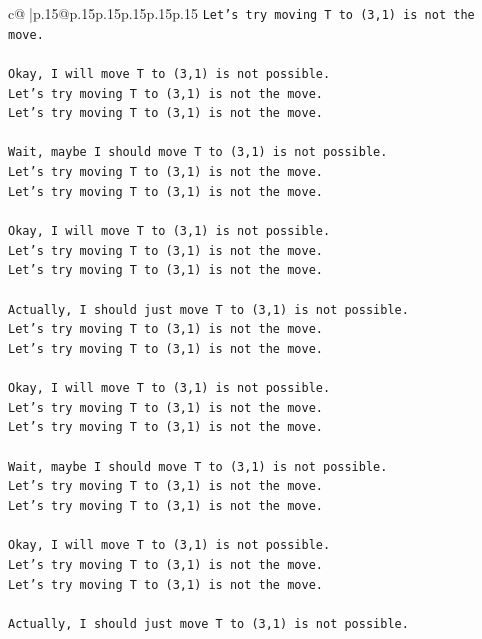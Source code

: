 \documentclass{article}
\begin{document}
{\begin{supertabular}{c@{$\;$}|p{.15\linewidth}@{}p{.15\linewidth}p{.15\linewidth}p{.15\linewidth}p{.15\linewidth}p{.15\linewidth}}
{{{\texttt{Let's try moving T to (3,1) is not the move.} \\
\\ 
\texttt{Okay, I will move T to (3,1) is not possible.} \\
\texttt{Let's try moving T to (3,1) is not the move.} \\
\texttt{Let's try moving T to (3,1) is not the move.} \\
\\ 
\texttt{Wait, maybe I should move T to (3,1) is not possible.} \\
\texttt{Let's try moving T to (3,1) is not the move.} \\
\texttt{Let's try moving T to (3,1) is not the move.} \\
\\ 
\texttt{Okay, I will move T to (3,1) is not possible.} \\
\texttt{Let's try moving T to (3,1) is not the move.} \\
\texttt{Let's try moving T to (3,1) is not the move.} \\
\\ 
\texttt{Actually, I should just move T to (3,1) is not possible.} \\
\texttt{Let's try moving T to (3,1) is not the move.} \\
\texttt{Let's try moving T to (3,1) is not the move.} \\
\\ 
\texttt{Okay, I will move T to (3,1) is not possible.} \\
\texttt{Let's try moving T to (3,1) is not the move.} \\
\texttt{Let's try moving T to (3,1) is not the move.} \\
\\ 
\texttt{Wait, maybe I should move T to (3,1) is not possible.} \\
\texttt{Let's try moving T to (3,1) is not the move.} \\
\texttt{Let's try moving T to (3,1) is not the move.} \\
\\ 
\texttt{Okay, I will move T to (3,1) is not possible.} \\
\texttt{Let's try moving T to (3,1) is not the move.} \\
\texttt{Let's try moving T to (3,1) is not the move.} \\
\\ 
\texttt{Actually, I should just move T to (3,1) is not possible.} \\
}}}
\end{supertabular}}
\end{document}
